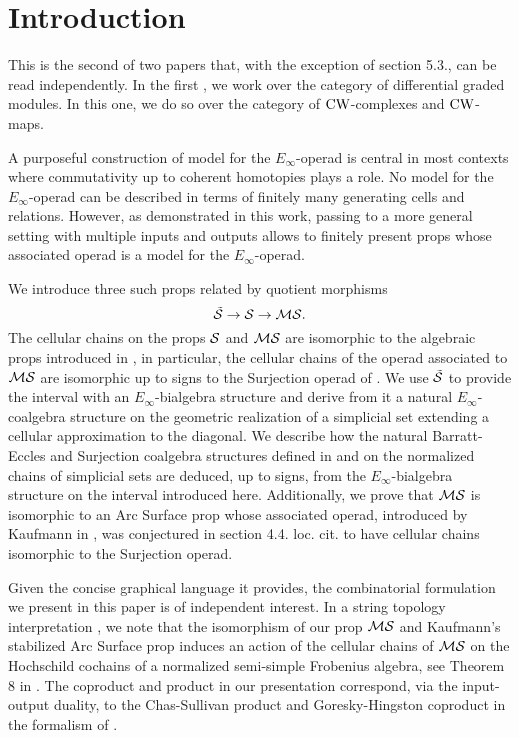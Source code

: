 \section{Introduction}

This is the second of two papers that, with the exception of section 5.3., can be read independently. In the first \cite{medina2020prop1}, we work over the category of differential graded modules. In this one, we do so over the category of \mbox{$\CW$-complexes} and \mbox{$\CW$-maps}. 

A purposeful construction of model for the $E_\infty$-operad is central in most contexts where commutativity up to coherent homotopies plays a role. No model for the $E_\infty$-operad can be described in terms of finitely many generating cells and relations. However, as demonstrated in this work, passing to a more general setting with multiple inputs and outputs allows to finitely present props whose associated operad is a model for the $E_\infty$-operad. 

We introduce three such props related by quotient morphisms
\begin{equation*}
\tilde{\S} \to \S \to \MS.
\end{equation*}
The cellular chains on the props $\S$ and $\MS$ are isomorphic to the algebraic props introduced in \cite{medina2020prop1}, in particular, the cellular chains of the operad associated to $\MS$ are isomorphic up to signs to the Surjection operad of \cite{mcclure2003multivariable, berger2004combinatorial}. We use $\tilde{\S}$ to provide the interval with an $E_\infty$-bialgebra structure and derive from it a natural $E_\infty$-coalgebra structure on the geometric realization of a simplicial set extending a cellular approximation to the diagonal. We describe how the natural Barratt-Eccles and Surjection coalgebra structures defined in \cite{berger2004combinatorial} and \cite{mcclure2003multivariable} on the normalized chains of simplicial sets are deduced, up to signs, from the $E_\infty$-bialgebra structure on the interval introduced here. Additionally, we prove that $\MS$ is isomorphic to an Arc Surface prop \cite{kaufmann03arc} whose associated operad, introduced by Kaufmann in \cite{kaufmann09dimension}, was conjectured in section 4.4. loc. cit. to have cellular chains isomorphic to the Surjection operad.

Given the concise graphical language it provides, the combinatorial formulation we present in this paper is of independent interest. In a string topology interpretation \cite{tradler07string, kaufmann08frobenious}, we note that the isomorphism of our prop $\MS$ and Kaufmann's stabilized Arc Surface prop induces an action of the cellular chains of $\MS$ on the Hochschild cochains of a normalized semi-simple Frobenius algebra, see Theorem 8 in \cite{kaufmann2008noncommutative}. The coproduct and product in our presentation correspond, via the input-output duality, to the Chas-Sullivan product \cite{chas1999string} and Goresky-Hingston coproduct \cite{goresky09loop} in the formalism of \cite{kaufmann2018detailed}.

